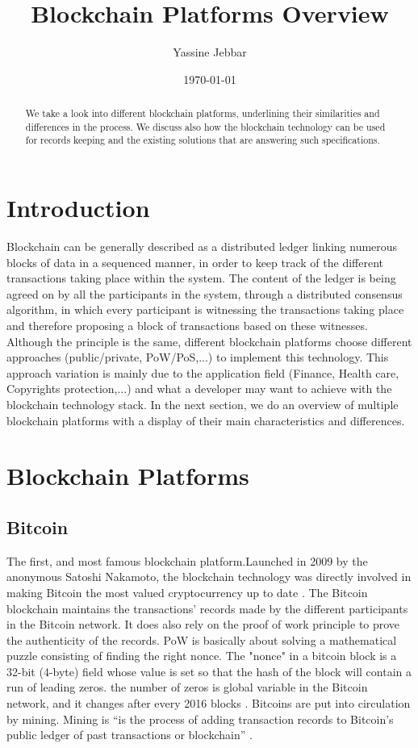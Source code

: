 \documentclass[a4paper]{article}
\title{Blockchain Platforms Overview}
\author{Yassine Jebbar}
\date{\today}
\begin{document}
\maketitle

\begin{abstract}
We take a look into different blockchain platforms, underlining their similarities and differences in the process. We discuss also how the blockchain technology can be used for records keeping and the existing solutions that are answering such specifications.
\end{abstract}

\section{Introduction}
Blockchain can be generally described as a distributed ledger linking numerous blocks of data in a sequenced manner, in order to keep track of the different transactions taking place within the system. The content of the ledger is being agreed on by all the participants in the system, through a distributed consensus algorithm, in which every participant is witnessing the transactions taking place and therefore proposing a block of transactions based on these witnesses. Although the principle is the same, different blockchain platforms choose different approaches (public/private, PoW/PoS,...) to implement this technology. This approach variation is mainly due to the application field (Finance, Health care, Copyrights protection,...) and what a developer may want to achieve with the blockchain technology stack. In the next section, we do an overview of multiple blockchain platforms with a display of their main characteristics and differences.  
\section{Blockchain Platforms}

\subsection{Bitcoin}
The first, and most famous blockchain platform.\enspace Launched in 2009 by the anonymous Satoshi Nakamoto, the blockchain technology was directly involved in making Bitcoin the most valued cryptocurrency up to date \cite{value}. The Bitcoin blockchain maintains the transactions' records made by the different participants in the Bitcoin network. It does also rely on the proof of work principle to prove the authenticity of the records. PoW is basically about solving a mathematical puzzle consisting of finding the right nonce. The "nonce" in a bitcoin block is a 32-bit (4-byte) field whose value is set so that the hash of the block will contain a run of leading zeros. the number of zeros is global variable in the Bitcoin network, and it changes after every 2016 blocks \cite{bitwiki}. Bitcoins are put into circulation by mining. Mining is “is the process of adding transaction records to Bitcoin's public ledger of past transactions or blockchain” \cite{mining}.
\end{document}
